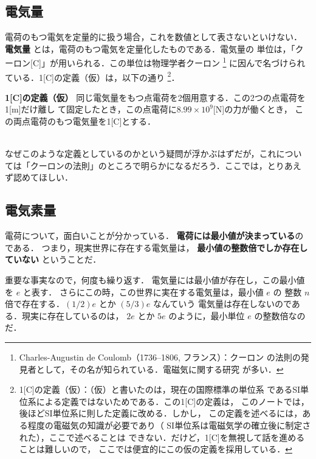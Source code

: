     \subsection{電気量}
    電荷のもつ電気を定量的に扱う場合，これを数値として表さないといけない．
    \textbf{電気量} とは，電荷のもつ電気を定量化したものである．電気量の
    単位は，「クーロン[C]」が用いられる．この単位は物理学者クーロン
        \footnote{
            Charles-Augustin de Coulomb（1736--1806, フランス）：クーロン
            の法則の発見者として，その名が知られている．電磁気に関する研究
            が多い．
        }
    に因んで名づけられている．1[C]の定義（仮）は，以下の通り
        \footnote{
            1[C]の定義（仮）：（仮）と書いたのは，現在の国際標準の単位系
            であるSI単位系による定義ではないためである．この1[C]の定義は，
            このノートでは，後ほどSI単位系に則した定義に改める．しかし，
            この定義を述べるには，ある程度の電磁気の知識が必要であり（
            SI単位系は電磁気学の確立後に制定された），ここで述べることは
            できない．だけど，1[C]を無視して話を進めることは難しいので，
            ここでは便宜的にこの仮の定義を採用している．
        }．
    \\
    \begin{itembox}[l]{\textbf{1[C]の定義（仮）}}
        同じ電気量をもつ点電荷を2個用意する．この2つの点電荷を1[m]だけ離し
        て固定したとき，この点電荷に$8.99 \times 10^{9}$[N]の力が働くとき，
        この両点電荷のもつ電気量を1[C]とする．
    \end{itembox}
    \\

    なぜこのような定義としているのかという疑問が浮かぶはずだが，これについ
    ては「クーロンの法則」のところで明らかになるだろう．ここでは，とりあえ
    ず認めてほしい．

    \subsection{電気素量}
        電荷について，面白いことが分かっている．
        \textbf{電荷には最小値が決まっている}のである．
        つまり，現実世界に存在する電気量は，
        \textbf{最小値の整数倍でしか存在していない} ということだ．

        重要な事実なので，何度も繰り返す．
        電気量には最小値が存在し，この最小値を $e$ と表す．
        さらにこの時，この世界に実在する電気量は，最小値 $e$ の
        整数 $n$ 倍で存在する．$(1/2)e$ とか $(5/3)e$ なんていう
        電気量は存在しないのである．現実に存在しているのは，
        $2e$ とか $5e$ のように，最小単位 $e$ の整数倍なのだ．


